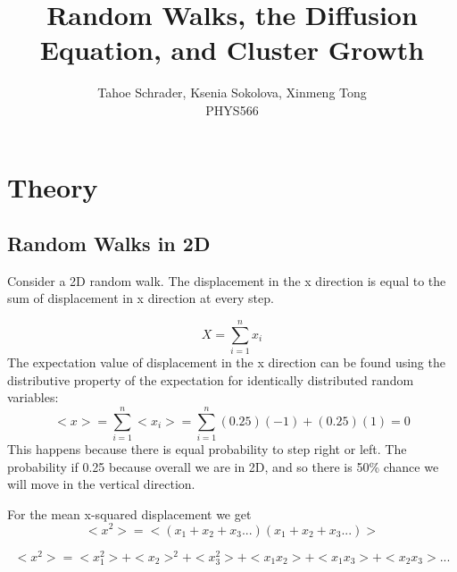 \documentclass[12pt]{article}
\title{Random Walks, the Diffusion Equation, and Cluster Growth}
\author{Tahoe Schrader, Ksenia Sokolova, Xinmeng Tong \\PHYS566}
\date{}
\begin{document}
\maketitle



\section{Theory}
\label{sec:theory}

\subsection{Random Walks in 2D}
Consider a 2D random walk. The displacement in the x direction is equal to the sum of displacement in x direction at every step. 

\begin{equation}
    X=\sum_{i=1}^{n} x_i
\end{equation}
The expectation value of displacement in the x direction can be found using the distributive property of the expectation for identically distributed random variables:
\begin{equation}
    <x>=\sum_{i=1}^{n} <x_i>=\sum_{i=1}^{n} (0.25)(-1)+(0.25)(1)=0
\end{equation}
This happens because there is equal probability to step right or left. The probability if 0.25 because overall we are in 2D, and so there is 50\% chance we will move in the vertical direction.

For the mean x-squared displacement we get
\begin{equation}
    <x^2>=<(x_1+x_2+x_3...)(x_1+x_2+x_3...)>
\end{equation}

\begin{equation}
    <x^2>=<x_1^2>+<x_2>^2+<x_3^2>+<x_1x_2>+<x_1x_3>+<x_2x_3>...
\end{equation}
\end{document}
